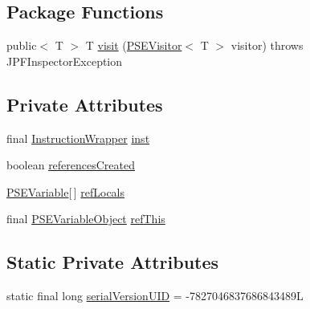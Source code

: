 \subsection*{Package Functions}
\begin{DoxyCompactItemize}
\item 
public$<$ T $>$ T \hyperlink{classgov_1_1nasa_1_1jpf_1_1inspector_1_1common_1_1pse_1_1_p_s_e_method_ac92f1bd1c6988224482d17c10c02cbb7}{visit} (\hyperlink{interfacegov_1_1nasa_1_1jpf_1_1inspector_1_1common_1_1pse_1_1_p_s_e_visitor}{P\+S\+E\+Visitor}$<$ T $>$ visitor)  throws J\+P\+F\+Inspector\+Exception 
\end{DoxyCompactItemize}
\subsection*{Private Attributes}
\begin{DoxyCompactItemize}
\item 
final \hyperlink{classgov_1_1nasa_1_1jpf_1_1inspector_1_1utils_1_1_instruction_wrapper}{Instruction\+Wrapper} \hyperlink{classgov_1_1nasa_1_1jpf_1_1inspector_1_1common_1_1pse_1_1_p_s_e_method_a00ed24d62e1a86b4097a5b8f8ab8091f}{inst}
\item 
boolean \hyperlink{classgov_1_1nasa_1_1jpf_1_1inspector_1_1common_1_1pse_1_1_p_s_e_method_aad3a32bc713529ebf58f93c2da4d0ba8}{references\+Created}
\item 
\hyperlink{classgov_1_1nasa_1_1jpf_1_1inspector_1_1common_1_1pse_1_1_p_s_e_variable}{P\+S\+E\+Variable}\mbox{[}$\,$\mbox{]} \hyperlink{classgov_1_1nasa_1_1jpf_1_1inspector_1_1common_1_1pse_1_1_p_s_e_method_a8a5112b3063aa54a1bcebd5e221f3584}{ref\+Locals}
\item 
final \hyperlink{classgov_1_1nasa_1_1jpf_1_1inspector_1_1common_1_1pse_1_1_p_s_e_variable_object}{P\+S\+E\+Variable\+Object} \hyperlink{classgov_1_1nasa_1_1jpf_1_1inspector_1_1common_1_1pse_1_1_p_s_e_method_ab4d1897315c76b6b214e57ef5ba072f8}{ref\+This}
\end{DoxyCompactItemize}
\subsection*{Static Private Attributes}
\begin{DoxyCompactItemize}
\item 
static final long \hyperlink{classgov_1_1nasa_1_1jpf_1_1inspector_1_1common_1_1pse_1_1_p_s_e_method_a5895256c706bd2b2dc8f014ac22f485c}{serial\+Version\+U\+ID} = -\/7827046837686843489L
\end{DoxyCompactItemize}


